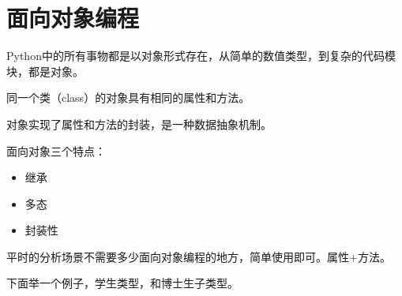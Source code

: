 \documentclass[12pt]{ctexart}
\providecommand{\tightlist}{%
      \setlength{\itemsep}{0pt}\setlength{\parskip}{0pt}}
\begin{document}
    \hypertarget{ux9762ux5411ux5bf9ux8c61ux7f16ux7a0b}{%
\section{面向对象编程}\label{ux9762ux5411ux5bf9ux8c61ux7f16ux7a0b}}

    Python中的所有事物都是以对象形式存在，从简单的数值类型，到复杂的代码模块，都是对象。

同一个类（class）的对象具有相同的属性和方法。

对象实现了属性和方法的封装，是一种数据抽象机制。

面向对象三个特点：

\begin{itemize}
\tightlist
\item
  继承
\item
  多态
\item
  封装性
\end{itemize}

平时的分析场景不需要多少面向对象编程的地方，简单使用即可。属性+方法。

    下面举一个例子，学生类型，和博士生子类型。
\end{document}
